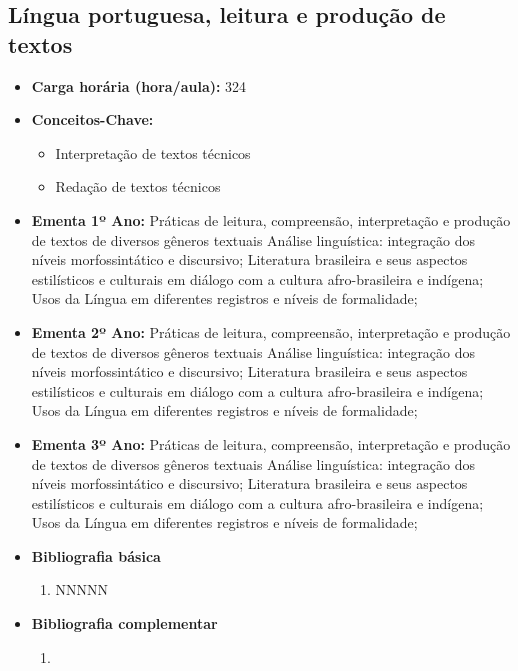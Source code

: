 \documentclass[11pt,fleqn]{book} %
\begin{document}
\subsection{Língua portuguesa, leitura e produção de textos}\label{disc:linguaportuguesa}
\begin{itemize}
	\item \textbf{Carga horária (hora/aula):} 324
	\item \textbf{Conceitos-Chave:}
	\begin{itemize}
		\item Interpretação de textos técnicos
		\item Redação de textos técnicos
	\end{itemize}
	\item \textbf{Ementa 1º Ano:} 
	Práticas de leitura, compreensão, interpretação e produção de textos de diversos gêneros textuais
	Análise linguística: integração dos níveis morfossintático e discursivo;
	Literatura brasileira e seus aspectos estilísticos e culturais em diálogo com a cultura afro-brasileira e indígena;
	Usos da Língua em diferentes registros e níveis de formalidade;

	\item \textbf{Ementa 2º Ano:} 
	Práticas de leitura, compreensão, interpretação e produção de textos de diversos gêneros textuais
	Análise linguística: integração dos níveis morfossintático e discursivo;
	Literatura brasileira e seus aspectos estilísticos e culturais em diálogo com a cultura afro-brasileira e indígena;
	Usos da Língua em diferentes registros e níveis de formalidade;

	\item \textbf{Ementa 3º Ano:} 
	Práticas de leitura, compreensão, interpretação e produção de textos de diversos gêneros textuais
	Análise linguística: integração dos níveis morfossintático e discursivo;
	Literatura brasileira e seus aspectos estilísticos e culturais em diálogo com a cultura afro-brasileira e indígena;
	Usos da Língua em diferentes registros e níveis de formalidade;	
	
	\item \textbf{Bibliografia básica}
	\begin{enumerate}
		\item NNNNN
	\end{enumerate}
	\item \textbf{Bibliografia complementar}
	\begin{enumerate}
		\item 
	\end{enumerate}	
\end{itemize}
\end{document}
